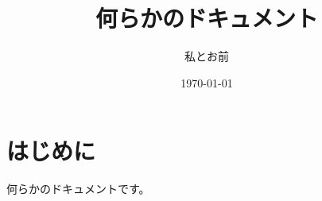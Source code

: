\documentclass[uplatex,dvipdfmx,a4paper]{jsarticle}
\title{何らかのドキュメント}
\author{私とお前}
\date{\today}
\begin{document}
\maketitle

\section{はじめに}

何らかのドキュメントです。
\end{document}
